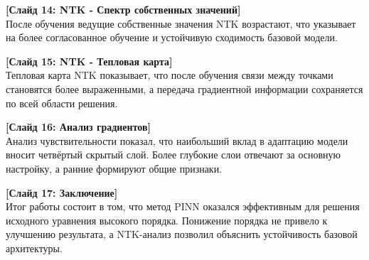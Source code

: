 \documentclass[a4paper,14pt]{extarticle}
\begin{document}
\vspace{0.8em}

\noindent \textbf{[Слайд 14: NTK - Спектр собственных значений]} \\
После обучения ведущие собственные значения NTK возрастают, что указывает на более согласованное обучение и устойчивую сходимость базовой модели.

\vspace{0.8em}

\noindent \textbf{[Слайд 15: NTK - Тепловая карта]} \\
Тепловая карта NTK показывает, что после обучения связи между точками становятся более выраженными, а передача градиентной информации сохраняется по всей области решения.

\vspace{0.8em}

\noindent \textbf{[Слайд 16: Анализ градиентов]} \\
Анализ чувствительности показал, что наибольший вклад в адаптацию модели вносит четвёртый скрытый слой. Более глубокие слои отвечают за основную настройку, а ранние формируют общие признаки.

\vspace{0.8em}

\noindent \textbf{[Слайд 17: Заключение]} \\
Итог работы состоит в том, что метод PINN оказался эффективным для решения исходного уравнения высокого порядка. Понижение порядка не привело к улучшению результата, а NTK-анализ позволил объяснить устойчивость базовой архитектуры.

\vspace{1em}
\end{document}
